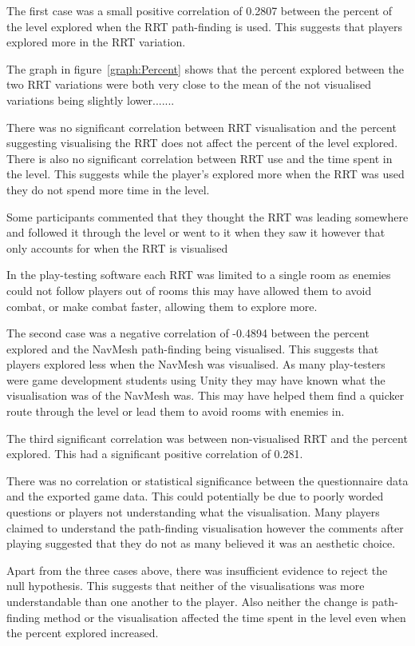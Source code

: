 \documentclass[journal]{IEEEtran}
\begin{document}
	The first case was a small positive correlation of 0.2807 between the percent of the level explored when the RRT path-finding is used. This suggests that players explored more in the RRT variation. 
	
	The graph in figure~\ref{graph:Percent} shows that the percent explored between the two RRT variations were both very close to the mean of the not visualised variations being slightly lower.......  
	
	
	There was no significant correlation between RRT visualisation and the percent suggesting visualising the RRT does not affect the percent of the level explored. There is also no significant correlation between RRT use and the time spent in the level. This suggests while the player's explored more when the RRT was used they do not spend more time in the level.  
	
	Some participants commented that they thought the RRT was leading somewhere and followed it through the level or went to it when they saw it however that only accounts for when the RRT is visualised
	
	In the play-testing software each RRT was limited to a single room as enemies could not follow players out of rooms this may have allowed them to avoid combat, or make combat faster, allowing them to explore more. 
	
	The second case was a negative correlation of -0.4894 between the percent explored and the NavMesh path-finding being visualised. This suggests that players explored less when the NavMesh was visualised.  As many play-testers were game development students using Unity they may have known what the visualisation was of the NavMesh was. This may have helped them find a quicker route through the level or lead them to avoid rooms with enemies in.
	
	The third significant correlation was between non-visualised RRT and the percent explored. This had a significant positive correlation of 0.281. 
	
	
	There was no correlation or statistical significance between the questionnaire data and the exported game data. This could potentially be due to poorly worded questions or players not understanding what the visualisation. Many players claimed to understand the path-finding visualisation however the comments after playing suggested that they do not as many believed it was an aesthetic choice.
	
	Apart from the three cases above, there was insufficient evidence to reject the null hypothesis.  This suggests that neither of the visualisations was more understandable than one another to the player. Also neither the change is path-finding method or the visualisation affected the time spent in the level even when the percent explored increased.
	
\end{document}

